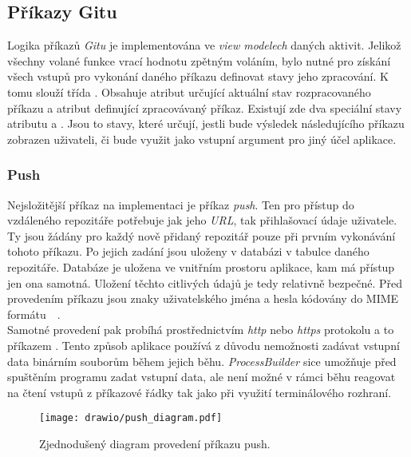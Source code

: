     \subsection{Příkazy Gitu}
    Logika příkazů \emph{Gitu} je implementována ve \emph{view modelech} daných aktivit. Jelikož všechny volané funkce vrací hodnotu zpětným voláním, bylo nutné pro získání všech vstupů pro vykonání daného příkazu definovat stavy jeho zpracování. K tomu slouží třída . Obsahuje atribut  určující aktuální stav rozpracovaného příkazu a atribut  definující zpracovávaný příkaz. Existují zde dva speciální stavy atributu   a . Jsou to stavy, které určují, jestli bude výsledek následujícího příkazu zobrazen uživateli, či bude využit jako vstupní argument pro jiný účel aplikace.

        \subsubsection{Push}
        Nejsložitější příkaz na implementaci je příkaz \emph{push}. Ten pro přístup do vzdáleného repozitáře potřebuje jak jeho \emph{URL}, tak přihlašovací údaje uživatele. Ty jsou žádány pro každý nově přidaný repozitář pouze při prvním vykonávání tohoto příkazu. Po jejich zadání jsou uloženy v databázi v tabulce daného repozitáře. Databáze je uložena ve vnitřním prostoru aplikace, kam má přístup jen ona samotná. Uložení těchto citlivých údajů je tedy relativně bezpečné. Před provedením příkazu jsou znaky uživatelského jména a hesla kódovány do  MIME formátu~~.\\ Samotné provedení pak probíhá prostřednictvím \emph{http} nebo \emph{https} protokolu a to příkazem .
        Tento způsob aplikace používá z důvodu nemožnosti zadávat vstupní data binárním souborům během jejich běhu. \emph{ProcessBuilder} sice umožňuje před spuštěním programu zadat vstupní data, ale není možné v rámci běhu reagovat na čtení vstupů z příkazové řádky tak jako při využití terminálového rozhraní.

        \newpage
        \begin{figure}[h]
            \centering
            \vspace{0.5cm}
            \texttt{[image: drawio/push\_diagram.pdf]}
            \caption[Diagram provedení příkazu push]{Zjednodušený diagram provedení příkazu push.}
            \label{diagram:push}
        \end{figure}
    
